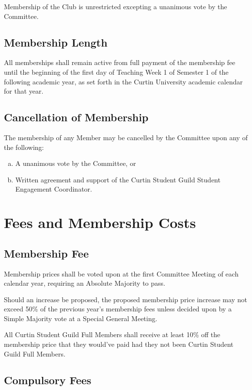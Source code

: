 \documentclass[a4paper,12pt]{article}
\begin{document}
Membership of the Club is unrestricted excepting a unanimous vote by the Committee.

\subsection{Membership Length}

All memberships shall remain active from full payment of the membership fee until the beginning of the first day of Teaching Week 1 of Semester 1 of the following academic year, as set forth in the Curtin University academic calendar for that year.

\subsection{Cancellation of Membership}

The membership of any Member may be cancelled by the Committee upon any of the following:

\begin{enumerate}[a)]
	\item A unanimous vote by the Committee, or
	\item Written agreement and support of the Curtin Student Guild Student Engagement Coordinator.
\end{enumerate}

\section{Fees and Membership Costs}

\subsection{Membership Fee}

Membership prices shall be voted upon at the first Committee Meeting of each calendar year, requiring an Absolute Majority to pass.

Should an increase be proposed, the proposed membership price increase may not exceed 50\% of the previous year's membership fees unless decided upon by a Simple Majority vote at a Special General Meeting.

All Curtin Student Guild Full Members shall receive at least 10\% off the membership price that they would've paid had they not been Curtin Student Guild Full Members.

\subsection{Compulsory Fees}
\end{document}
